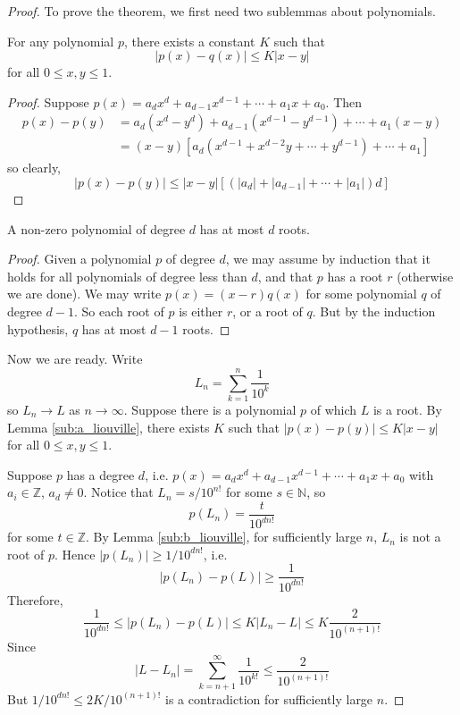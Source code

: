 \documentclass[10pt, a4paper, twoside]{report}
\begin{document}
\begin{proof}
    To prove the theorem, we first need two sublemmas about polynomials.
\begin{lemma}
    For any polynomial \(p\), there exists a constant \(K\) such that 
    \[|p(x)-q(x)|\leq K|x-y|\]
    for all \(0\leq x,y\leq 1\).
    \label{sub:a_liouville}
\end{lemma}
\begin{proof}
    Suppose \(p(x)=a_dx^d+a_{d-1}x^{d-1}+\cdots+a_1x+a_0\).
    Then
    \begin{align*}
        p(x)-p(y)&=a_d(x^d-y^d)+a_{d-1}(x^{d-1}-y^{d-1})+\cdots+a_1(x-y) \\
        &=(x-y)\left[a_d(x^{d-1}+x^{d-2}y+\cdots+y^{d-1})+\cdots+a_1\right]
    \end{align*}
    so clearly,
    \[|p(x)-p(y)|\leq|x-y|\left[(|a_d|+|a_{d-1}|+\cdots+|a_1|)d\right]\]
\end{proof}
\begin{lemma}
    A non-zero polynomial of degree \(d\) has at most \(d\) roots.
    \label{sub:b_liouville}
\end{lemma}
\begin{proof}
    Given a polynomial \(p\) of degree \(d\), we may assume by induction that it holds for all polynomials of degree less than \(d\), and that \(p\) has a root \(r\) (otherwise we are done). We may write \(p(x)=(x-r)q(x)\) for some polynomial \(q\) of degree \(d-1\). So each root of \(p\) is either \(r\), or a root of \(q\). But by the induction hypothesis, \(q\) has at most \(d-1\) roots.
\end{proof}
    Now we are ready.
    Write
    \[L_n=\sum_{k=1}^{n}\frac{1}{10^k}\]
    so \(L_n\to L\) as \(n\to\infty\). Suppose there is a polynomial \(p\) of which \(L\) is a root. By Lemma \ref{sub:a_liouville}, there exists \(K\) such that \(|p(x)-p(y)|\leq K|x-y|\) for all \(0\leq x,y\leq 1\).

    Suppose \(p\) has a degree \(d\), i.e. \(p(x)=a_dx^d+a_{d-1}x^{d-1}+\cdots+a_1x+a_0\) with \(a_i\in\mathbb{Z}\), \(a_d\neq 0\). Notice that \(L_n=s/10^{n!}\) for some \(s\in\mathbb{N}\), so
    \[p(L_n)=\frac{t}{10^{dn!}}\]
    for some \(t\in\mathbb{Z}\). By Lemma \ref{sub:b_liouville}, for sufficiently large \(n\), \(L_n\) is not a root of \(p\). Hence \(|p(L_n)|\geq 1/10^{dn!}\), i.e. 
    \[|p(L_n)-p(L)|\geq\frac{1}{10^{dn!}}\]
    Therefore, 
    \[\frac{1}{10^{dn!}}\leq|p(L_n)-p(L)|\leq K|L_n-L|\leq K\frac{2}{10^{(n+1)!}}\]
    Since 
    \[|L-L_n|=\sum_{k=n+1}^{\infty}\frac 1{10^{k!}}\leq\frac{2}{10^{(n+1)!}}\]
    But \(1/10^{dn!}\leq 2K/10^{(n+1)!}\) is a contradiction for sufficiently large \(n\).
\end{proof}
\end{document}
